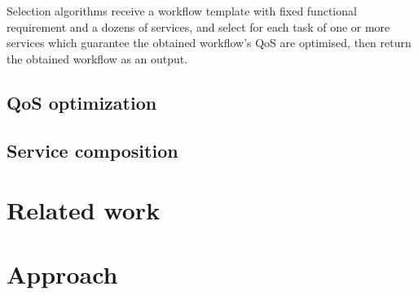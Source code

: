\documentclass[senior,final,11pt]{iscs-thesis}
\begin{document}
Selection algorithms receive a workflow template with fixed functional requirement and a dozens of services, and select for each task of one or more services which guarantee the obtained workflow's QoS are optimised, then return the obtained workflow as an output.




\section{QoS optimization}%
\section{Service composition}

\chapter{Related  work}


\chapter{Approach}%
\end{document}
